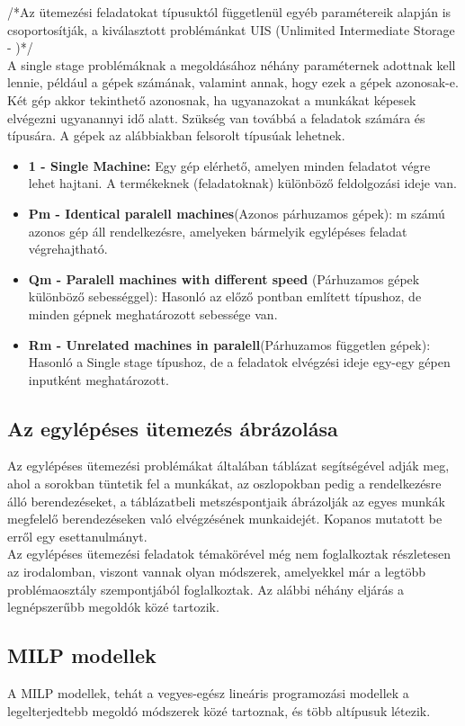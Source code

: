 \documentclass {report}
\begin{document}
/*Az ütemezési feladatokat típusuktól függetlenül egyéb paramétereik alapján is csoportosítják, a kiválasztott problémánkat UIS (Unlimited Intermediate Storage -  )*/\\
A single stage problémáknak a megoldásához néhány paraméternek adottnak kell lennie, például a gépek számának, valamint annak, hogy ezek a gépek azonosak-e. Két gép akkor tekinthető azonosnak, ha ugyanazokat a munkákat képesek elvégezni ugyanannyi idő alatt. Szükség van továbbá a feladatok számára és típusára. A gépek az alábbiakban felsorolt típusúak lehetnek.
\begin{itemize}
\item \textbf{1 - Single Machine:} Egy gép elérhető, amelyen minden feladatot végre lehet hajtani. A termékeknek (feladatoknak) különböző feldolgozási ideje van. 
\item \textbf{Pm - Identical paralell machines}(Azonos párhuzamos gépek): m számú azonos gép áll rendelkezésre, amelyeken bármelyik egylépéses feladat végrehajtható.
\item \textbf{Qm - Paralell machines with different speed} (Párhuzamos gépek különböző sebességgel): Hasonló az előző pontban említett típushoz, de minden gépnek meghatározott sebessége van.
\item \textbf{Rm - Unrelated machines in paralell}(Párhuzamos független gépek): Hasonló a Single stage típushoz, de a feladatok elvégzési ideje egy-egy gépen inputként meghatározott.  
\end{itemize}

\subsection{Az egylépéses ütemezés ábrázolása}
Az egylépéses ütemezési problémákat általában táblázat segítségével adják meg, ahol a sorokban tüntetik fel a munkákat, az oszlopokban pedig a rendelkezésre álló berendezéseket, a táblázatbeli metszéspontjaik ábrázolják az egyes munkák megfelelő berendezéseken való elvégzésének munkaidejét. Kopanos mutatott be erről egy esettanulmányt.\\

Az egylépéses ütemezési feladatok témakörével még nem foglalkoztak részletesen az irodalomban, viszont vannak olyan módszerek, amelyekkel már a legtöbb problémaosztály szempontjából foglalkoztak. Az alábbi néhány eljárás a legnépszerűbb megoldók közé tartozik.

\subsection{MILP modellek}
  A MILP modellek, tehát a vegyes-egész lineáris programozási modellek a legelterjedtebb megoldó módszerek közé tartoznak, és több altípusuk létezik.
\end{document}
